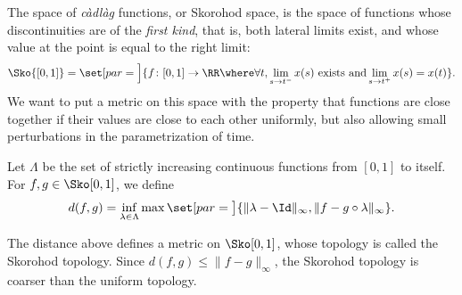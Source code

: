 \documentclass[../main]{subfiles}
\begin{document}
The space of \textit{càdlàg} functions, or Skorohod space, is the space of functions whose
discontinuities are of the \textit{first kind}, that is, both lateral limits exist, and whose value
at the point is equal to the right limit:
\begin{equation*}
  \Sko{[0,1]} = \set[par=\Big]{ f \colon [0,1] \to \RR \where \forall t, \lim_{s \to t^-}x(s) \text{ exists and} \lim_{s \to t^+}x(s) = x(t) }.
\end{equation*}
We want to put a metric on this space with the property that functions are close together if their values are close to each other uniformly, but also allowing small perturbations in the parametrization of time. 


\begin{definition}
  Let \(\Lambda\) be the set of strictly increasing continuous functions from \([0,1]\) to itself. For \(f,g \in \WPS\), we define
  \begin{equation}\label{eq:sko-metric}
    d(f,g) = \inf_{\lambda \in \Lambda} \max\set[par = \big]{ \lVert \lambda - \Id \rVert_{\infty}, \lVert f - g \circ \lambda \rVert_{\infty}}.
  \end{equation}
\end{definition}
The distance above defines a metric on \(\WPS\), whose topology is called the Skorohod topology. Since \(d(f,g) \leq \lVert f - g \rVert_{\infty}\), the Skorohod topology is coarser than the uniform topology.
\end{document}

